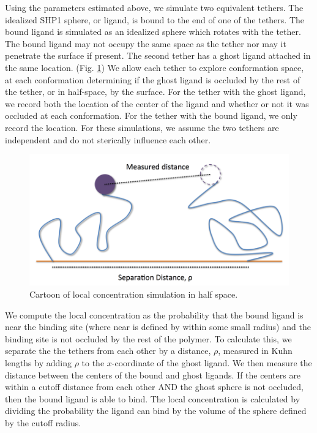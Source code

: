 \documentclass[../../AdvancementSummary.tex]{subfiles}
\begin{document}
Using the parameters estimated above, we simulate two equivalent tethers.  The idealized SHP1 sphere, or ligand, is bound to the end of one of the tethers. The bound ligand is simulated as an idealized sphere which rotates with the tether.  The bound ligand may not occupy the same space as the tether nor may it penetrate the surface if present. The second tether has a ghost ligand attached in the same location.  (Fig. \ref{fig: LocalConcCartoon}) We allow each tether to explore conformation space, at each conformation determining if the ghost ligand is occluded by the rest of the tether, or in half-space, by the surface. For the tether with the ghost ligand, we record both the location of the center of the ligand and whether or not it was occluded at each conformation.  For the tether with the bound ligand, we only record the location. For these simulations, we assume the two tethers are independent and do not sterically influence each other.

\begin{figure}
\includegraphics[width=\linewidth]{Diagram.png}
\caption{Cartoon of local concentration simulation in half space. \label{fig: LocalConcCartoon}}
\end{figure}

We compute the local concentration as the probability that the bound ligand is near the binding site (where near is defined by within some small radius) and the binding site is not occluded by the rest of the polymer. To calculate this, we separate the the tethers from each other by a distance, $\rho$, measured in Kuhn lengths by adding $\rho$ to the $x$-coordinate of the ghost ligand. We then measure the distance between the centers of the bound and ghost ligands. If the centers are within a cutoff distance from each other AND the ghost sphere is not occluded, then the bound ligand is able to bind.  The local concentration is calculated by dividing the probability the ligand can bind by the volume of the sphere defined by the cutoff radius.
\end{document}
